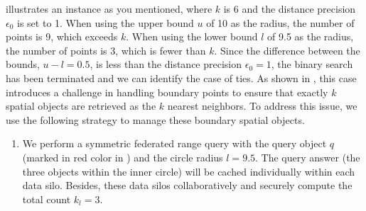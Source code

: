 \begin{example}\label{exp:special-knn}
     illustrates an instance as you mentioned,
    where $k$ is 6 and the distance precision $\epsilon_0$ is set to 1.
    When using the upper bound $u$ of 10 as the radius, the number of points is 9, which exceeds $k$. 
    When using the lower bound $l$ of 9.5 as the radius, the number of points is 3, which is fewer than $k$. 
    Since the difference between the bounds, $u-l=0.5$, is less than the distance precision $\epsilon_0=1$, the binary search has been terminated and we can identify the case of ties.
    As shown in , this case introduces a challenge in handling boundary points to ensure that exactly $k$ spatial objects are retrieved as the $k$ nearest neighbors. 
   To address this issue, we use the following strategy to manage these boundary spatial objects. 
   
   \begin{enumerate}[(1)]
    \item
    We perform a symmetric federated range query with the query object $q$ (marked in red color in ) and the circle radius $l = 9.5$.
    The query answer (\ie the three objects within the inner circle) will be cached individually within each data silo.
    Besides, these data silos collaboratively and securely compute the total count $k_l = 3$.
    
    

\end{enumerate}
\end{example}
